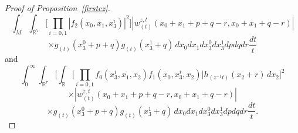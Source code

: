 \documentclass[12pt,reqno]{amsart}
\theoremstyle{plain}
\theoremstyle{definition}
\numberwithin{equation}{section}
\newcommand{\R}{{\mathbb R}}
\begin{document}
\begin{proof}[Proof of Proposition~\ref{firstcz}]
\begin{equation}
\int_{M} \int_{\R^7} \Big[\prod_{i=0,1} |f_{2}(x_0,x_1,x_3^i)|^2 \Big ]  
|w^{z,t}_{(t)}(x_0+x_1+p+q-r, x_0+x_1+q-r)| 
\end{equation}
\begin{equation*}
\times g_{(t)}(x_3^0+p+q)
g_{(t)}(x_3^1+q) 
 \,dx_0 dx_1 dx_3^0 dx_3^1 dp dq dr \frac{dt}{t}
\end{equation*}
and
\begin{equation*}
\int_{0}^\infty \int_{\R^7} 
\Big[
\int_{\R} \Big [ \prod_{i=0,1}f_0(x_3^i,x_1,x_2)f_1(x_0,x_3^i,x_2) \Big ] 
h_{(z^{-1}t)}(x_2+r) \,dx_2\Big]^2 \end{equation*}
\begin{equation*}
\times |w^{z,t}_{(t)}(x_0+x_1+p+q-r, x_0+x_1+q-r)| 
\end{equation*}
\begin{equation}\label{E:first-term}
\times g_{(t)}(x_3^0+p+q)
g_{(t)}(x_3^1+q) 
\,dx_0 dx_1 dx_3^0 dx_3^1 dp dq dr \frac{dt}{t}.
\end{equation}


\end{proof}
\end{document}
